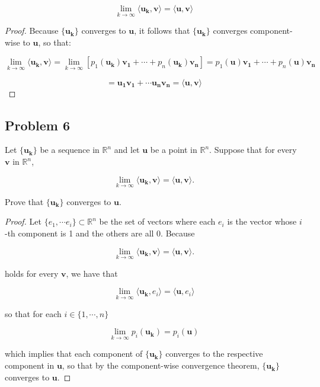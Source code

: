 \documentclass{article}
\begin{document}
\[ \lim_{k\to\infty} \langle \mathbf{u_k}, \mathbf{v} \rangle = \langle \mathbf{u}, \mathbf{v} \rangle\]

\begin{proof}

Because $\mathbf{\{u_k\}}$ converges to $\mathbf{u}$, it follows that $\mathbf{\{u_k\}}$ converges component-wise to $\mathbf{u}$, so that:

\[ \lim_{k\to\infty} \langle \mathbf{u_k}, \mathbf{v} \rangle = \lim_{k\to\infty} [p_1(\mathbf{u_k})\mathbf{v_1} + \cdots + p_n(\mathbf{u_k})\mathbf{v_n}] = p_1(\mathbf{u})\mathbf{v_1} + \cdots + p_n(\mathbf{u})\mathbf{v_n}\]

\[ = \mathbf{u_1}\mathbf{v_1} + \cdots \mathbf{u_n}\mathbf{v_n} = \langle \mathbf{u}, \mathbf{v} \rangle \]

\end{proof}

\subsection*{Problem 6}
Let $\mathbf{\{u_k\}}$ be a sequence in $\mathbb{R}^n$ and let $\mathbf{u}$ be a point in $\mathbb{R}^n$. Suppose that for every $\mathbf{v}$ in $\mathbb{R}^n$,

\[ \lim_{k\to\infty} \langle \mathbf{u_k}, \mathbf{v} \rangle = \langle \mathbf{u}, \mathbf{v} \rangle.\]

Prove that $\mathbf{\{u_k\}}$ converges to $\mathbf{u}$.

\begin{proof}

Let $\{e_1, \cdots e_i\} \subset \mathbb{R}^n$ be the set of vectors where each $e_i$ is the vector whose $i$-th component is 1 and the others are all 0. Because 

\[ \lim_{k\to\infty} \langle \mathbf{u_k}, \mathbf{v} \rangle = \langle \mathbf{u}, \mathbf{v} \rangle.\]

holds for every $\mathbf{v}$, we have that

\[ \lim_{k\to\infty} \langle \mathbf{u_k}, e_i \rangle = \langle \mathbf{u}, e_i \rangle\]

so that for each $i \in \{1, \cdots, n\}$

\[ \lim_{k\to\infty} p_i(\mathbf{u_k}) = p_i(\mathbf{u}) \]

which implies that each component of $\mathbf{\{u_k\}}$ converges to the respective component in $\mathbf{u}$, so that by the component-wise convergence theorem, $\mathbf{\{u_k\}}$ converges to $\mathbf{u}$.

\end{proof}
\end{document}
